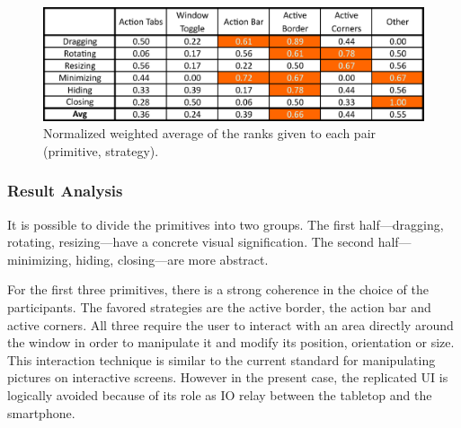 \begin{figure}[htb]
  \centering
    \includegraphics[scale=1]{images/resultMatrix}
  \caption{Normalized weighted average of the ranks given to each pair (primitive, strategy).}
  \label{resultMatrix}
\end{figure}


\subsubsection{Result Analysis}

It is possible to divide the primitives into two groups.
The first half---dragging, rotating, resizing---have a concrete visual signification.
The second half---minimizing, hiding, closing---are more abstract.

For the first three primitives, there is a strong coherence in the choice of the participants.
The favored strategies are the active border, the action bar and active corners.
All three require the user to interact with an area directly around the window in order to manipulate it and modify its position, orientation or size.
This interaction technique is similar to the current standard for manipulating pictures on interactive screens.
However in the present case, the replicated UI is logically avoided because of its role as IO relay between the tabletop and the smartphone.

